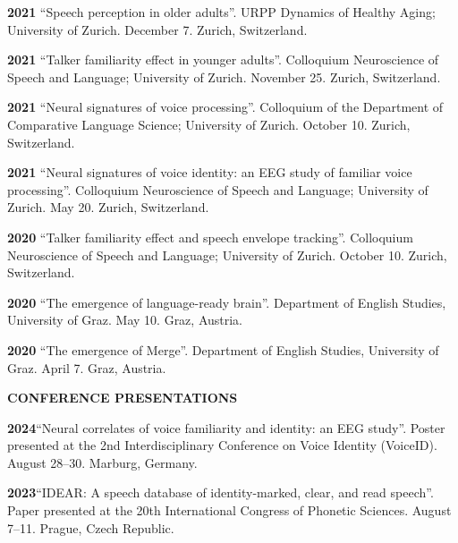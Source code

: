 \documentclass[11pt]{article}
\newcommand{\hangpara}{
 \setlength{\parindent}{0in} %
 \hangindent=0.42in %
}
\begin{document}
\vskip 6pt
\hangpara
{\bf 2021}\hspace{1ex} “Speech perception in older adults”. URPP Dynamics of Healthy Aging; University of Zurich. December 7. Zurich, Switzerland.

\vskip 6pt
\hangpara
{\bf 2021}\hspace{1ex} “Talker familiarity effect in younger adults”. Colloquium Neuroscience of Speech and Language; University of Zurich. November 25. Zurich, Switzerland.

\vskip 6pt
\hangpara
{\bf 2021}\hspace{1ex} “Neural signatures of voice processing”. Colloquium of the Department of Comparative Language Science; University of Zurich. October 10. Zurich, Switzerland.

\vskip 6pt
\hangpara
{\bf 2021}\hspace{1ex} “Neural signatures of voice identity: an EEG study of familiar voice processing”. Colloquium Neuroscience of Speech and Language; University of Zurich. May 20. Zurich, Switzerland.

\vskip 6pt
\hangpara
{\bf 2020}\hspace{1ex} “Talker familiarity effect and speech envelope tracking”. Colloquium Neuroscience of Speech and Language; University of Zurich. October 10. Zurich, Switzerland.

\vskip 6pt
\hangpara
{\bf 2020}\hspace{1ex} “The emergence of language-ready brain”. Department of English Studies, University of Graz. May 10. Graz, Austria.

\vskip 6pt
\hangpara
{\bf 2020}\hspace{1ex} “The emergence of Merge”. Department of English Studies, University of Graz. April 7. Graz, Austria.





\vskip 20pt
\begin{flushleft}
{\bf CONFERENCE PRESENTATIONS}
\end{flushleft}

\vskip 6pt
\hangpara
{\bf 2024}\hspace{1ex}“Neural correlates of voice familiarity and identity: an EEG study”. Poster presented at the 2nd Interdisciplinary Conference on Voice Identity (VoiceID). August 28--30. Marburg, Germany.


\vskip 6pt
\hangpara
{\bf 2023}\hspace{1ex}“IDEAR: A speech database of identity-marked, clear, and read speech”. Paper presented at the 20th International Congress of Phonetic Sciences. August 7--11. Prague, Czech Republic.
\end{document}
